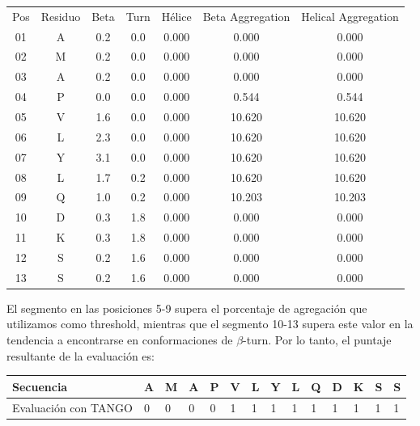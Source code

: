 \vspace{0.3cm}
\begin{center}
\begin{tabular}{ccccccc}
Pos & Residuo & Beta & Turn & 	Hélice & Beta Aggregation & Helical Aggregation\\
01 &          A & 0.2 & 0.0 &  0.000  & 0.000 &  0.000\\
02 &          M  &     0.2 &    0.0 &  0.000 &  0.000 &  0.000\\
03 &          A &      0.2  &      0.0 &  0.000 &  0.000  & 0.000\\
04  &         P &      0.0   &     0.0 &  0.000 &  0.544  & 0.544\\
05  &         V &      1.6   &     0.0 &  0.000 &  10.620 & 10.620\\
06   &        L &      2.3   &     0.0 &  0.000 &  10.620 & 10.620\\
07      &     Y &      3.1   &     0.0 &  0.000 &  10.620 & 10.620\\
08        &   L &      1.7   &     0.2 &  0.000 &  10.620 & 10.620\\
09         &  Q &      1.0   &     0.2 &  0.000 &  10.203 & 10.203\\
10   &        D &      0.3    &    1.8 &  0.000 &  0.000 &  0.000\\
11  &         K &      0.3   &     1.8 &  0.000 &  0.000 &  0.000\\
12  &         S &      0.2   &     1.6 &  0.000 &  0.000 &  0.000\\
13  &         S  &     0.2  &      1.6 &  0.000 &  0.000 &  0.000\\
\end{tabular}
\end{center}

\vspace{0.5cm}
El segmento en las posiciones 5-9 supera el porcentaje de agregación que utilizamos como threshold, mientras que el segmento 10-13 supera este valor en la tendencia a encontrarse en conformaciones de $\beta$-turn.
Por lo tanto, el puntaje resultante de la evaluación es:

\vspace{0.5cm}
\begin{center}
\begin{tabular}{llllllllllllll} 
\hline      		
Secuencia & \textbf{A} & \textbf{M} & \textbf{A} & \textbf{P} & \textbf{V} & \textbf{L} & \textbf{Y} & \textbf{L} & \textbf{Q} & \textbf{D} & \textbf{K} & \textbf{S} & \textbf{S} \\ \hline
Evaluación con TANGO & 0 & 0 & 0 & 0 & 1 & 1 & 1 & 1 & 1 & 1 & 1 & 1 & 1 \\ \hline
\end{tabular}
\end{center}





